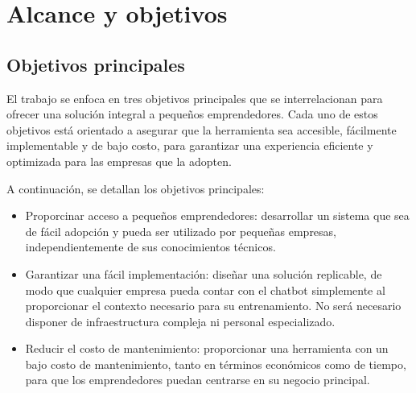 
\section{Alcance y objetivos{}}

\subsection{Objetivos principales}

El trabajo se enfoca en tres objetivos principales que se interrelacionan para ofrecer una solución integral a pequeños emprendedores. Cada uno de estos objetivos está orientado a asegurar que la herramienta sea accesible, fácilmente implementable y de bajo costo, para garantizar una experiencia eficiente y optimizada para las empresas que la adopten. 
 
A continuación, se detallan los objetivos principales:


\begin{itemize}
    \item Proporcinar acceso a pequeños emprendedores: desarrollar un sistema que sea de fácil adopción y pueda ser utilizado por pequeñas empresas, independientemente de sus conocimientos técnicos.
    
    \item Garantizar una fácil implementación: diseñar una solución replicable, de modo que cualquier empresa pueda contar con el chatbot simplemente al proporcionar el contexto necesario para su entrenamiento. No será necesario disponer de infraestructura compleja ni personal especializado.
    
    \item Reducir el costo de mantenimiento: proporcionar una herramienta con un bajo costo de mantenimiento, tanto en términos económicos como de tiempo, para que los emprendedores puedan centrarse en su negocio principal.
    
\end{itemize}



